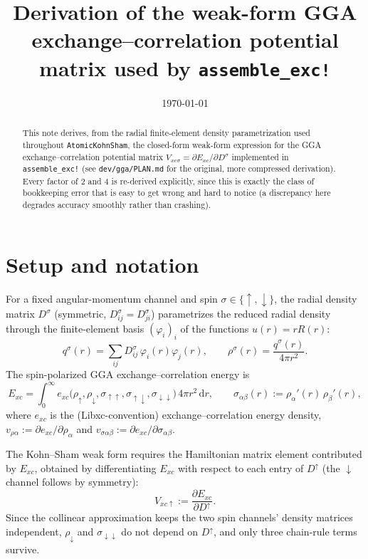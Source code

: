 \documentclass[11pt,a4paper]{article}
\title{Derivation of the weak-form GGA exchange--correlation potential\\
matrix used by \texttt{assemble\_exc!}}
\author{}
\date{\today}
\newcommand{\dd}{\mathrm{d}}
\newcommand{\exc}{e_{xc}}
\newcommand{\Exc}{E_{xc}}
\newcommand{\vrho}[1]{v_{\rho#1}}
\newcommand{\vsig}[1]{v_{\sigma#1}}
\begin{document}
\maketitle

\begin{abstract}
This note derives, from the radial finite-element density parametrization
used throughout \texttt{AtomicKohnSham}, the closed-form weak-form
expression for the GGA exchange--correlation potential matrix
$V_{xc\sigma} = \partial \Exc/\partial D^\sigma$ implemented in
\texttt{assemble\_exc!} (see \texttt{dev/gga/PLAN.md} for the original,
more compressed derivation). Every factor of $2$ and $4$ is re-derived
explicitly, since this is exactly the class of bookkeeping error that is
easy to get wrong and hard to notice (a discrepancy here degrades accuracy
smoothly rather than crashing).
\end{abstract}

\section{Setup and notation}

For a fixed angular-momentum channel and spin $\sigma \in \{\uparrow,\downarrow\}$,
the radial density matrix $D^\sigma$ (symmetric, $D^\sigma_{ij} = D^\sigma_{ji}$)
parametrizes the reduced radial density through the finite-element basis
$(\varphi_i)_i$ of the functions $u(r) = rR(r)$:
\begin{equation}
    q^\sigma(r) = \sum_{ij} D^\sigma_{ij}\,\varphi_i(r)\varphi_j(r), \qquad
    \rho^\sigma(r) = \frac{q^\sigma(r)}{4\pi r^2}.
\end{equation}
The spin-polarized GGA exchange--correlation energy is
\begin{equation}
    \Exc = \int_0^\infty \exc\big(\rho_\uparrow,\rho_\downarrow,
        \sigma_{\uparrow\uparrow},\sigma_{\uparrow\downarrow},\sigma_{\downarrow\downarrow}\big)\,
        4\pi r^2\,\dd r, \qquad
    \sigma_{\alpha\beta}(r) := \rho_\alpha'(r)\,\rho_\beta'(r),
\end{equation}
where $\exc$ is the (Libxc-convention) exchange--correlation energy density,
$\vrho{\alpha} := \partial \exc/\partial\rho_\alpha$ and
$\vsig{\alpha\beta} := \partial \exc/\partial\sigma_{\alpha\beta}$.

The Kohn--Sham weak form requires the Hamiltonian matrix element
contributed by $\Exc$, obtained by differentiating $\Exc$ with respect to
each entry of $D^\uparrow$ (the $\downarrow$ channel follows by symmetry):
\begin{equation}
    V_{xc\uparrow} := \frac{\partial \Exc}{\partial D^\uparrow}.
\end{equation}
Since the collinear approximation keeps the two spin channels' density
matrices independent, $\rho_\downarrow$ and $\sigma_{\downarrow\downarrow}$
do not depend on $D^\uparrow$, and only three chain-rule terms survive.
\end{document}
